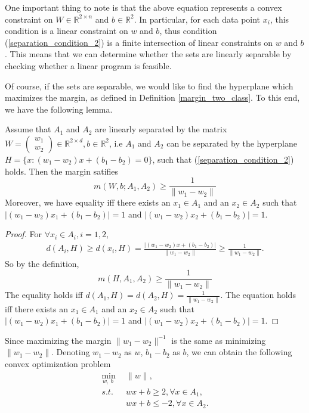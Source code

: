 One important thing to note is that the above equation represents a convex constraint on $W\in \mathbb{R}^{2\times n}$ and
$b\in \mathbb{R}^2$. In particular, for each data point $x_i$, this condition is a linear constraint on $w$ and $b$, thus
condition (\ref{separation_condition_2}) is a finite intersection of linear constraints on $w$ and $b$. This means that
we can determine whether the sets are linearly separable by checking whether a linear program is feasible.

Of course, if the sets are separable, we would like to find the hyperplane which maximizes the margin, as defined in
Definition \ref{margin_two_class}. To this end, we have the following lemma.
\begin{lemma}
	Assume that $A_1$ and $A_2$ are linearly separated by the matrix $W=
	\begin{pmatrix}
	w_1\\
	w_2
	\end{pmatrix}
	\in \mathbb{R}^{2\times d}, 
	b\in
	\mathbb{R}^2 $, i.e $A_1$ and $A_2$ can be separated by the hyperplane $H=\{x:(w_1-w_2)x+(b_1-b_2)=0\}$, such that (\ref{separation_condition_2})
	holds. 
	Then the margin satifies
	\begin{equation}
	m(W,b;A_1,A_2)\geq \frac{1}{\|w_1-w_2\|}
	\end{equation}
	Moreover, we have equality iff there exists an $x_1\in A_1$ and
	an $x_2\in A_2$ such that $|(w_1-w_2)x_1+(b_1-b_2)| = 1$ and $|(w_1-w_2)x_2+(b_1-b_2)| = 1$.
	
\end{lemma}

\begin{proof}
	For $\forall x_i \in A_i, i=1,2$,
	\begin{align}
	d(A_i, H)\ge d(x_i, H)=\frac{|(w_1-w_2)x+(b_1-b_2)|}{\|w_1-w_2\|}\ge \frac{1}{\|w_1-w_2\|}.
	\end{align}
	So by the definition, 
	\begin{equation}
	m(H,A_1,A_2)\geq \frac{1}{\|w_1-w_2\|}
	\end{equation}
	The equality holds iff $d(A_1, H)= d(A_2, H)=\frac{1}{\|w_1-w_2\|}.$ The equation holds iff there exists an $x_1\in A_1$ and
	an $x_2\in A_2$ such that $|(w_1-w_2)x_1+(b_1-b_2)| = 1$ and $|(w_1-w_2)x_2+(b_1-b_2)| = 1$.
\end{proof}


Since maximizing the margin $\|w_1-w_2\|^{-1}$ is the same as minimizing $\|w_1-w_2\|$. Denoting $w_1-w_2$ as $w$, $b_1-b_2$ as $b$, we can obtain the following  convex optimization problem
\begin{align}\label{2class_hard_op}
\min_{w,~b~}~~&\|w\|,\\
s.t.~~&wx+b \geq 2, \forall x\in A_1,\\
&wx+b \leq -2, \forall x \in A_2.
\end{align}

